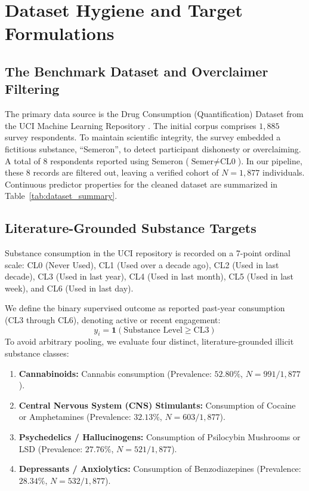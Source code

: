 \documentclass[conference]{IEEEtran}
\begin{document}
\section{Dataset Hygiene and Target Formulations}

\subsection{The Benchmark Dataset and Overclaimer Filtering}
The primary data source is the Drug Consumption (Quantification) Dataset from the UCI Machine Learning Repository \cite{fehrman2017substance}. The initial corpus comprises $1,885$ survey respondents. To maintain scientific integrity, the survey embedded a fictitious substance, ``Semeron'', to detect participant dishonesty or overclaiming. A total of 8 respondents reported using Semeron ($\text{Semer} \neq \text{CL0}$). In our pipeline, these 8 records are filtered out, leaving a verified cohort of $N = 1,877$ individuals. Continuous predictor properties for the cleaned dataset are summarized in Table~\ref{tab:dataset_summary}.

\subsection{Literature-Grounded Substance Targets}
Substance consumption in the UCI repository is recorded on a 7-point ordinal scale: CL0 (Never Used), CL1 (Used over a decade ago), CL2 (Used in last decade), CL3 (Used in last year), CL4 (Used in last month), CL5 (Used in last week), and CL6 (Used in last day). 

We define the binary supervised outcome as reported past-year consumption (CL3 through CL6), denoting active or recent engagement:
\begin{equation}
y_i = \mathbf{1}(\text{Substance Level} \ge \text{CL3})
\end{equation}
To avoid arbitrary pooling, we evaluate four distinct, literature-grounded illicit substance classes:
\begin{enumerate}
    \item \textbf{Cannabinoids:} Cannabis consumption (Prevalence: $52.80\%$, $N=991/1,877$).
    \item \textbf{Central Nervous System (CNS) Stimulants:} Consumption of Cocaine or Amphetamines (Prevalence: $32.13\%$, $N=603/1,877$).
    \item \textbf{Psychedelics / Hallucinogens:} Consumption of Psilocybin Mushrooms or LSD (Prevalence: $27.76\%$, $N=521/1,877$).
    \item \textbf{Depressants / Anxiolytics:} Consumption of Benzodiazepines (Prevalence: $28.34\%$, $N=532/1,877$).
\end{enumerate}
\end{document}
